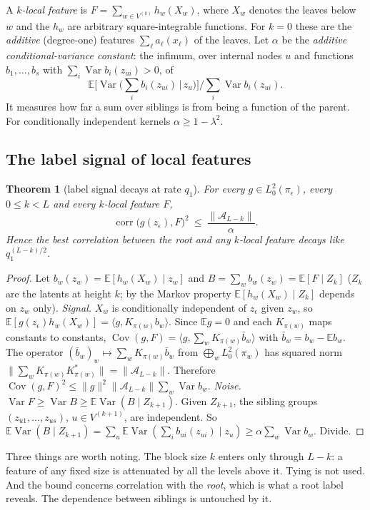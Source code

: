 \documentclass[11pt]{article}
\newtheorem{theorem}{Theorem}
\theoremstyle{definition}
\newcommand{\E}{\mathbb{E}}
\newcommand{\Var}{\operatorname{Var}}
\newcommand{\norm}[1]{\lVert #1\rVert}
\newcommand{\Cov}{\operatorname{Cov}}
\begin{document}
A \emph{$k$-local feature} is $F=\sum_{w\in V^{(k)}}h_w(X_w)$, where $X_w$ denotes the leaves below $w$ and
the $h_w$ are arbitrary square-integrable functions. For $k=0$ these are the \emph{additive} (degree-one)
features $\sum_\ell a_\ell(x_\ell)$ of the leaves. Let $\alpha$ be the \emph{additive conditional-variance
constant}: the infimum, over internal nodes $u$ and functions $b_1,\dots,b_s$ with
$\sum_i\Var b_i(z_{ui})>0$, of
\[
\E\big[\Var\big(\textstyle\sum_ib_i(z_{ui})\,\big|\,z_u\big)\big]\Big/\textstyle\sum_i\Var b_i(z_{ui}).
\]
It measures how far a sum over siblings is from being a function of the parent. For conditionally
independent kernels $\alpha\ge1-\lambda^2$.

\subsection{The label signal of local features}
\begin{theorem}[label signal decays at rate $q_1$]\label{thm:labelsignal}
For every $g\in L^2_0(\pi_\epsilon)$, every $0\le k<L$ and every $k$-local feature $F$,
\[
\operatorname{corr}\big(g(z_\epsilon),F\big)^2\ \le\ \frac{\norm{\mathcal A_{L-k}}}{\alpha}.
\]
Hence the best correlation between the root and any $k$-local feature decays like $q_1^{(L-k)/2}$.
\end{theorem}
\begin{proof}
Let $b_w(z_w)=\E[h_w(X_w)\mid z_w]$ and $B=\sum_wb_w(z_w)=\E[F\mid Z_k]$ ($Z_k$ are the latents at height
$k$; by the Markov property $\E[h_w(X_w)\mid Z_k]$ depends on $z_w$ only).
\emph{Signal.} $X_w$ is conditionally independent of $z_\epsilon$ given $z_w$, so
$\E[g(z_\epsilon)h_w(X_w)]=\langle g,K_{\pi(w)}b_w\rangle$. Since $\E g=0$ and each $K_{\pi(w)}$ maps
constants to constants, $\Cov(g,F)=\langle g,\sum_wK_{\pi(w)}\bar b_w\rangle$ with $\bar b_w=b_w-\E b_w$.
The operator $(\bar b_w)_w\mapsto\sum_wK_{\pi(w)}\bar b_w$ from $\bigoplus_wL^2_0(\pi_w)$ has squared norm
$\norm{\sum_wK_{\pi(w)}K_{\pi(w)}^*}=\norm{\mathcal A_{L-k}}$. Therefore
$\Cov(g,F)^2\le\norm g^2\norm{\mathcal A_{L-k}}\sum_w\Var b_w$.
\emph{Noise.} $\Var F\ge\Var B\ge\E\Var(B\mid Z_{k+1})$. Given $Z_{k+1}$, the sibling groups
$(z_{u1},\dots,z_{us})$, $u\in V^{(k+1)}$, are independent. So
$\E\Var(B\mid Z_{k+1})=\sum_u\E\Var(\sum_ib_{ui}(z_{ui})\mid z_u)\ge\alpha\sum_w\Var b_w$.
Divide.
\end{proof}
\noindent Three things are worth noting. The block size $k$ enters only through $L-k$: a feature of any
fixed size is attenuated by all the levels above it. Tying is not used. And the bound concerns
correlation with the \emph{root}, which is what a root label reveals. The dependence between siblings
is untouched by it.
\end{document}
